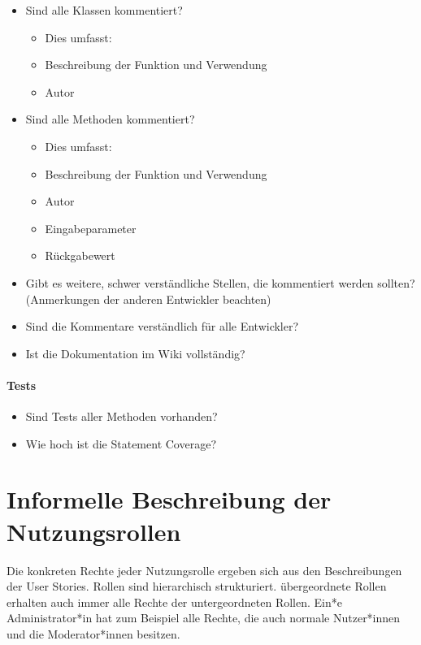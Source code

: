 \documentclass[accentcolor=tud0b,12pt,paper=a4]{tudreport}
\begin{document}
\begin{multicols}{2}
	\renewcommand{\labelitemi}{\scriptsize$\square$}	\renewcommand{\labelitemii}{\scriptsize$\square$}
	\renewcommand{\labelitemiii}{\scriptsize$\square$}
	\begin{itemize}
		\item Sind alle Klassen kommentiert?
		\begin{itemize}
			\item[] Dies umfasst:
			\item Beschreibung der Funktion und Verwendung
			\item Autor
		\end{itemize}
		\item Sind alle Methoden kommentiert?
		\begin{itemize}
			\item[] Dies umfasst:
			\item Beschreibung der Funktion und Verwendung
			\item Autor
			\item Eingabeparameter
			\item Rückgabewert
		\end{itemize}
		\item Gibt es weitere, schwer verständliche Stellen, die kommentiert werden sollten? (Anmerkungen der anderen Entwickler beachten)
		\item Sind die Kommentare verständlich für alle Entwickler?
		\item Ist die Dokumentation im Wiki vollständig?
	\end{itemize}


\paragraph{Tests}

	\begin{itemize}
		\renewcommand{\labelitemi}{\scriptsize$\square$}
		\renewcommand{\labelitemii}{\scriptsize$\square$}
		\renewcommand{\labelitemiii}{\scriptsize$\square$}
		\item Sind Tests aller Methoden vorhanden?
		\item Wie hoch ist die Statement Coverage?
	\end{itemize}
\end{multicols}

\section{Informelle Beschreibung der Nutzungsrollen}
Die konkreten Rechte jeder Nutzungsrolle ergeben sich aus den Beschreibungen der User Stories. Rollen sind hierarchisch strukturiert. übergeordnete Rollen erhalten auch immer alle Rechte der untergeordneten Rollen. Ein*e Administrator*in hat zum Beispiel alle Rechte, die auch normale Nutzer*innen und die Moderator*innen besitzen.
\end{document}
